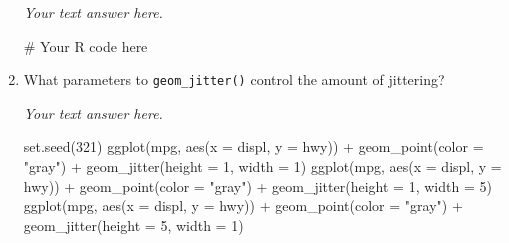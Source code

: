 \documentclass[
  letterpaper,
  DIV=11,
  numbers=noendperiod]{scrreprt}
\newenvironment{Shaded}{\begin{snugshade}}{\end{snugshade}}
\newcommand{\AttributeTok}[1]{\textcolor[rgb]{0.40,0.45,0.13}{#1}}
\newcommand{\CommentTok}[1]{\textcolor[rgb]{0.37,0.37,0.37}{#1}}
\newcommand{\DecValTok}[1]{\textcolor[rgb]{0.68,0.00,0.00}{#1}}
\newcommand{\FunctionTok}[1]{\textcolor[rgb]{0.28,0.35,0.67}{#1}}
\newcommand{\NormalTok}[1]{\textcolor[rgb]{0.00,0.23,0.31}{#1}}
\newcommand{\SpecialCharTok}[1]{\textcolor[rgb]{0.37,0.37,0.37}{#1}}
\newcommand{\StringTok}[1]{\textcolor[rgb]{0.13,0.47,0.30}{#1}}
\begin{document}
\begin{enumerate}
\begin{tcolorbox}
  \emph{Your text answer here.}

  \end{tcolorbox}

\begin{Shaded}
\begin{Highlighting}[]
\CommentTok{\# Your R code here}
\end{Highlighting}
\end{Shaded}

  \begin{figure}

  \end{figure}
\item
  What parameters to \texttt{geom\_jitter()} control the amount of
  jittering?

  \begin{tcolorbox}[enhanced jigsaw, left=2mm, rightrule=.15mm, bottomtitle=1mm, opacitybacktitle=0.6, leftrule=.75mm, opacityback=0, colframe=quarto-callout-note-color-frame, bottomrule=.15mm, coltitle=black, toptitle=1mm, colback=white, titlerule=0mm, colbacktitle=quarto-callout-note-color!10!white, title={Answer}, toprule=.15mm, breakable, arc=.35mm]

  \emph{Your text answer here.}

  \end{tcolorbox}

\begin{Shaded}
\begin{Highlighting}[]
\FunctionTok{set.seed}\NormalTok{(}\DecValTok{321}\NormalTok{)}
\FunctionTok{ggplot}\NormalTok{(mpg, }\FunctionTok{aes}\NormalTok{(}\AttributeTok{x =}\NormalTok{ displ, }\AttributeTok{y =}\NormalTok{ hwy)) }\SpecialCharTok{+}
  \FunctionTok{geom\_point}\NormalTok{(}\AttributeTok{color =} \StringTok{"gray"}\NormalTok{) }\SpecialCharTok{+}
  \FunctionTok{geom\_jitter}\NormalTok{(}\AttributeTok{height =} \DecValTok{1}\NormalTok{, }\AttributeTok{width =} \DecValTok{1}\NormalTok{)}
\FunctionTok{ggplot}\NormalTok{(mpg, }\FunctionTok{aes}\NormalTok{(}\AttributeTok{x =}\NormalTok{ displ, }\AttributeTok{y =}\NormalTok{ hwy)) }\SpecialCharTok{+}
  \FunctionTok{geom\_point}\NormalTok{(}\AttributeTok{color =} \StringTok{"gray"}\NormalTok{) }\SpecialCharTok{+}
  \FunctionTok{geom\_jitter}\NormalTok{(}\AttributeTok{height =} \DecValTok{1}\NormalTok{, }\AttributeTok{width =} \DecValTok{5}\NormalTok{)}
\FunctionTok{ggplot}\NormalTok{(mpg, }\FunctionTok{aes}\NormalTok{(}\AttributeTok{x =}\NormalTok{ displ, }\AttributeTok{y =}\NormalTok{ hwy)) }\SpecialCharTok{+}
  \FunctionTok{geom\_point}\NormalTok{(}\AttributeTok{color =} \StringTok{"gray"}\NormalTok{) }\SpecialCharTok{+}
  \FunctionTok{geom\_jitter}\NormalTok{(}\AttributeTok{height =} \DecValTok{5}\NormalTok{, }\AttributeTok{width =} \DecValTok{1}\NormalTok{)}
\end{Highlighting}
\end{Shaded}


\end{enumerate}
\end{document}
